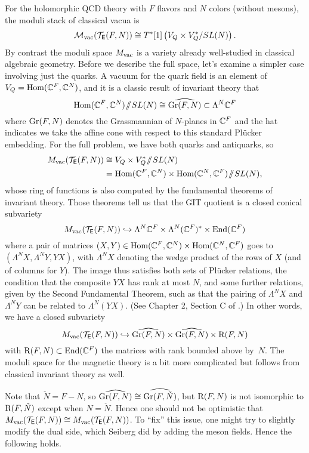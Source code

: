 \documentclass[11pt]{amsart}
\begin{document}
For the holomorphic QCD theory with $F$ flavors and $N$ colors (without mesons), 
the moduli stack of classical vacua is 
\[
\mathcal M_{\rm vac}(\mathcal T_{\mathsf E}(F,N)) \cong T^*[1] \left(V_Q \times V_Q^*/SL(N)\right).
\]
By contrast the moduli space $M_{\rm vac}$ is a variety already well-studied in classical algebraic geometry.
Before we describe the full space, let's examine a simpler case involving just the quarks.
A vacuum for the quark field is an element of $V_Q = {\rm Hom}(\mathbb C^F, \mathbb C^N)$,
and it is a classic result of invariant theory that
\[
{\rm Hom}(\mathbb C^F, \mathbb C^N)\!\sslash\! SL(N) \cong \widehat{{\rm Gr}(F, N)} \subset \Lambda^N \mathbb C^F
\]
where ${\rm Gr}(F, N)$ denotes the Grassmannian of $N$-planes in $\mathbb C^F$ and the hat indicates we take the affine cone with respect to this standard Pl\"ucker embedding.
For the full problem, we have both quarks and antiquarks, so
\begin{align*}
M_{\rm vac}(\mathcal T_{\mathsf E}(F,N)) 
&\cong V_Q \times V_Q^*\!\sslash\! SL(N) \\
&= {\rm Hom}(\mathbb C^F, \mathbb C^N) \times {\rm Hom}(\mathbb C^N, \mathbb C^F)\!\sslash\! SL(N),
\end{align*}
whose ring of functions is also computed by the fundamental theorems of invariant theory.
Those theorems tell us that the GIT quotient is a closed conical subvariety
\[
M_{\rm vac}(\mathcal T_{\mathsf E}(F,N))  \hookrightarrow \Lambda^N \mathbb C^F \times \Lambda^N (\mathbb C^F)^* \times {\rm End}(\mathbb C^F)
\]
where a pair of matrices $(X,Y) \in {\rm Hom}(\mathbb C^F, \mathbb C^N) \times {\rm Hom}(\mathbb C^N, \mathbb C^F)$ goes to $(\Lambda^N X, \Lambda^N Y, YX)$, with $\Lambda^N X$ denoting the wedge product of the rows of $X$ (and of columns for $Y$).
The image thus satisfies both sets of Pl\"ucker relations, the condition that the composite $YX$ has rank at most $N$, and some further relations, given by the Second Fundamental Theorem, such as that the pairing of $\Lambda^N X$ and $\Lambda^N Y$ can be related to $\Lambda^N (YX)$.
(See Chapter 2, Section C of \cite{Weyl}.)
In other words, we have a closed subvariety
\[
M_{\rm vac}(\mathcal T_{\mathsf E}(F,N)) \hookrightarrow \widehat{{\rm Gr}(F, N)} \times \widehat{{\rm Gr}(F, N)} \times {\rm R}(F,N)
\]
with ${\rm R}(F,N) \subset {\rm End}(\mathbb C^F)$ the matrices with rank bounded above by~$N$.
The moduli space for the magnetic theory is a bit more complicated but follows from classical invariant theory as well.

Note that $\check{N} = F-N$, so $\widehat{{\rm Gr}(F, N)} \cong \widehat{{\rm Gr}(F, \check{N})}$,
but ${\rm R}(F,N)$ is not isomorphic to ${\rm R}(F,\check{N})$ except when $N = \check{N}$.
Hence one should not be optimistic that $M_{\rm vac}(\mathcal T_{\mathsf E}(F,N)) \cong M_{\rm vac}(\mathcal T_{\mathsf E}(F,N))$.
To ``fix'' this issue, one might try to slightly modify the dual side, which Seiberg did by adding the meson fields.
Hence the following holds.
\end{document}
